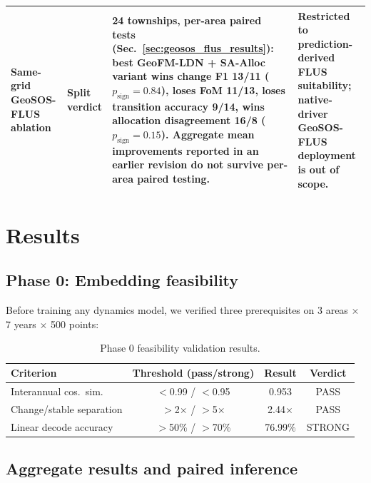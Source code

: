 \documentclass{article}
\begin{document}
\begin{table}[htbp]
\begin{tabular}{@{}P{0.20\textwidth}P{0.11\textwidth}P{0.37\textwidth}P{0.26\textwidth}@{}}
Same-grid GeoSOS-FLUS ablation & Split verdict & 24 townships, per-area paired tests (Sec.~\ref{sec:geosos_flus_results}): best GeoFM-LDN + SA-Alloc variant wins change F1 13/11 ($p_\text{sign}=0.84$), loses FoM 11/13, loses transition accuracy 9/14, wins allocation disagreement 16/8 ($p_\text{sign}=0.15$). Aggregate mean improvements reported in an earlier revision do not survive per-area paired testing. & Restricted to prediction-derived FLUS suitability; native-driver GeoSOS-FLUS deployment is out of scope. \\
\bottomrule
\end{tabular}
\end{table}


\section{Results}
\label{sec:results}

\subsection{Phase 0: Embedding feasibility}

Before training any dynamics model, we verified three prerequisites on 3 areas $\times$ 7 years $\times$ 500 points:

\begin{table}[htbp]
\centering
\caption{Phase 0 feasibility validation results.}
\label{tab:phase0}
\begin{tabular}{lccc}
\toprule
Criterion & Threshold (pass/strong) & Result & Verdict \\
\midrule
Interannual cos.~sim. & $<$0.99 / $<$0.95 & 0.953 & PASS \\
Change/stable separation & $>$2$\times$ / $>$5$\times$ & 2.44$\times$ & PASS \\
Linear decode accuracy & $>$50\% / $>$70\% & 76.99\% & STRONG \\
\bottomrule
\end{tabular}
\end{table}

\subsection{Aggregate results and paired inference}
\end{document}

